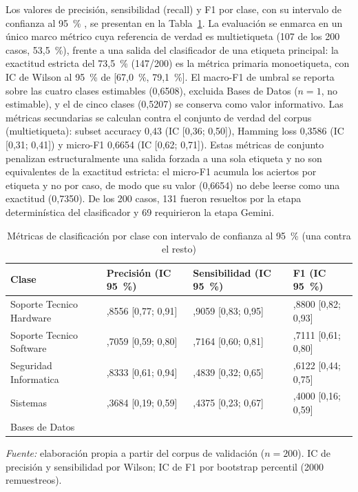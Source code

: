 Los valores de precisión, sensibilidad (recall) y F1 por clase, con su intervalo de confianza al 95~\% \parencite{Sokolova2009_performance_measures}, se presentan en la Tabla~\ref{tab:metricas}. La evaluación se enmarca en un único marco métrico cuya referencia de verdad es multietiqueta (107 de los 200 casos, 53,5~\%), frente a una salida del clasificador de una etiqueta principal: la exactitud estricta del 73,5~\% (147/200) es la métrica primaria monoetiqueta, con IC de Wilson al 95~\% de [67,0~\%, 79,1~\%]. El macro-F1 de umbral se reporta sobre las cuatro clases estimables (0,6508), excluida Bases de Datos (\(n = 1\), no estimable), y el de cinco clases (0,5207) se conserva como valor informativo. Las métricas secundarias se calculan contra el conjunto de verdad del corpus (multietiqueta): subset accuracy 0,43 (IC [0,36; 0,50]), Hamming loss 0,3586 (IC [0,31; 0,41]) y micro-F1 0,6654 (IC [0,62; 0,71]). Estas métricas de conjunto penalizan estructuralmente una salida forzada a una sola etiqueta y no son equivalentes de la exactitud estricta: el micro-F1 acumula los aciertos por etiqueta y no por caso, de modo que su valor (0,6654) no debe leerse como una exactitud (0,7350). De los 200 casos, 131 fueron resueltos por la etapa determinística del clasificador y 69 requirieron la etapa Gemini.

\begin{table}[htbp]
\centering
\caption{Métricas de clasificación por clase con intervalo de confianza al 95~\% (una contra el resto)}
\label{tab:metricas}
\small
\setlength{\tabcolsep}{4pt}
\begin{tabular}{@{}>{\raggedright\arraybackslash}p{4.5cm} >{\centering\arraybackslash}p{3.4cm} >{\centering\arraybackslash}p{3.4cm} >{\centering\arraybackslash}p{3.4cm}@{}}
\toprule
\textbf{Clase} & \textbf{Precisión (IC 95~\%)} & \textbf{Sensibilidad (IC 95~\%)} & \textbf{F1 (IC 95~\%)} \\
\midrule
Soporte Tecnico Hardware  & 0,8556 [0,77; 0,91] & 0,9059 [0,83; 0,95] & 0,8800 [0,82; 0,93] \\
Soporte Tecnico Software  & 0,7059 [0,59; 0,80] & 0,7164 [0,60; 0,81] & 0,7111 [0,61; 0,80] \\
Seguridad Informatica     & 0,8333 [0,61; 0,94] & 0,4839 [0,32; 0,65] & 0,6122 [0,44; 0,75] \\
Sistemas                  & 0,3684 [0,19; 0,59] & 0,4375 [0,23; 0,67] & 0,4000 [0,16; 0,59] \\
Bases de Datos            & \multicolumn{3}{c}{no estimable (\(n = 1\))} \\
\bottomrule
\end{tabular}
\par\smallskip
{\footnotesize\textit{Fuente:} elaboración propia a partir del corpus de validación (\(n = 200\)). IC de precisión y sensibilidad por Wilson; IC de F1 por bootstrap percentil (2000 remuestreos).\par}
\end{table}

